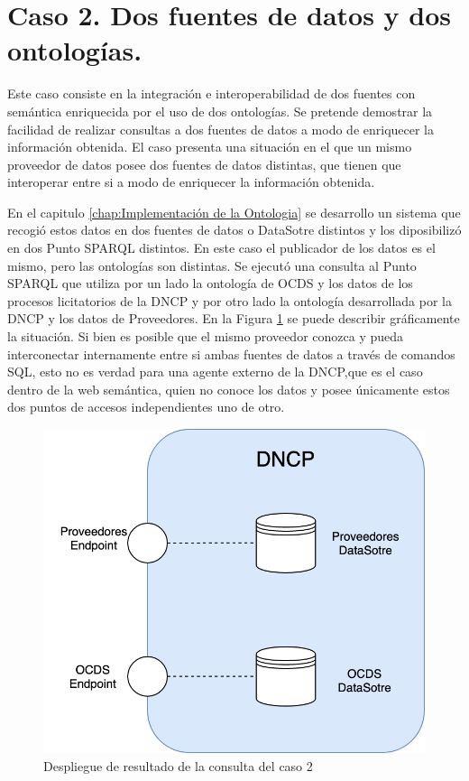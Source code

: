 \section{Caso 2. Dos fuentes de datos y dos ontologías.}
\label{section:caso2}

Este caso consiste en la integración e interoperabilidad de dos fuentes con semántica enriquecida por el uso de dos ontologías. Se pretende demostrar la facilidad de realizar consultas a dos fuentes de datos a modo de enriquecer la información obtenida. El caso presenta una situación en el que un mismo proveedor de datos posee dos fuentes de datos distintas, que tienen que interoperar entre si a modo de enriquecer la información obtenida.

En el capitulo \ref{chap:Implementación de la Ontologia} se desarrollo un sistema que recogió estos datos en dos fuentes de datos o DataSotre distintos y los diposibilizó en dos Punto SPARQL distintos. En este caso el publicador de los datos es el mismo, pero las ontologías son distintas. Se ejecutó una consulta al Punto SPARQL que utiliza por un lado la ontología de OCDS y los datos de los procesos licitatorios de la DNCP y por otro lado la ontología desarrollada por la DNCP y los datos de Proveedores.  En la Figura \ref{img:Diagramacaso2Endpoint} se puede describir gráficamente la situación. Si bien es posible que el mismo proveedor conozca y pueda interconectar internamente entre si ambas fuentes de datos a través de comandos SQL, esto no es verdad para una agente externo de la DNCP,que es el caso dentro de la web semántica, quien no conoce los datos y posee únicamente estos dos puntos de accesos independientes uno de otro.

 \begin{figure}[ht!]
    \centering
    \includegraphics[width=150mm]{figuras/Diagramas-Caso2-Ilustracion.png}
    \caption{Despliegue de resultado de la consulta del caso 2}
    \label{img:Diagramacaso2Endpoint}
 \end{figure}


